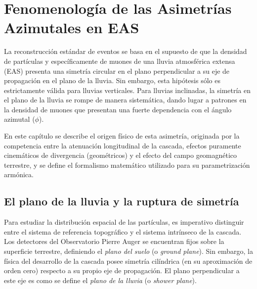 %

\section{Fenomenología de las Asimetrías Azimutales en EAS}
\label{sec:fenomenologia}

La reconstrucción estándar de eventos se basa en el supuesto de que la densidad de partículas y específicamente de muones de una lluvia atmosférica extensa (EAS) presenta una simetría circular en el plano perpendicular a su eje de propagación en el plano de la lluvia. Sin embargo, esta hipótesis sólo es estrictamente válida para lluvias verticales. Para lluvias inclinadas, la simetría en el plano de la lluvia se rompe de manera sistemática, dando lugar a patrones en la densidad de muones que presentan una fuerte dependencia con el ángulo azimutal ($\phi$).

En este capítulo se describe el origen físico de esta asimetría, originada por la competencia entre la atenuación longitudinal de la cascada, efectos puramente cinemáticos de divergencia (geométricos) y el efecto del campo geomagnético terrestre, y se define el formalismo matemático utilizado para su parametrización armónica.

\subsection{El plano de la lluvia y la ruptura de simetría}
\label{subsec:simetria_ruptura}

Para estudiar la distribución espacial de las partículas, es imperativo distinguir entre el sistema de referencia topográfico y el sistema intrínseco de la cascada. Los detectores del Observatorio Pierre Auger se encuentran fijos sobre la superficie terrestre, definiendo el \textit{plano del suelo} (o \textit{ground plane}). Sin embargo, la física del desarrollo de la cascada posee simetría cilíndrica (en su aproximación de orden cero) respecto a su propio eje de propagación. El plano perpendicular a este eje es como se define el \textit{plano de la lluvia} (o \textit{shower plane}).


